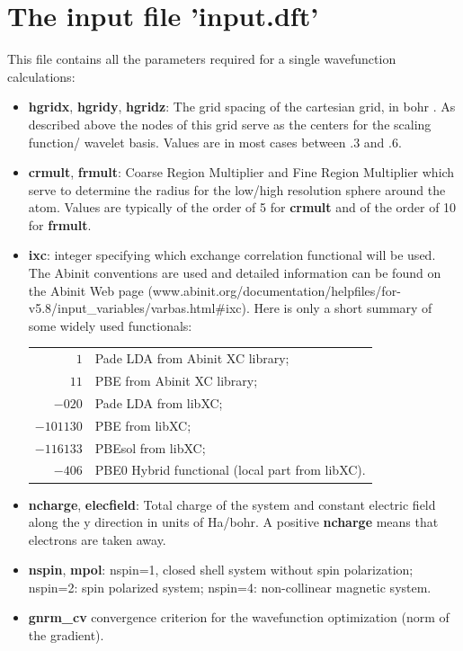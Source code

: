\documentclass[a4paper,11pt]{report}
\begin{document}
\section{The input file 'input.dft'}
This file contains all the parameters required for a single wavefunction calculations:
\begin{itemize}
\item {\bf hgridx}, {\bf hgridy}, {\bf hgridz}: The grid spacing of the cartesian grid, in bohr . As 
       described above the nodes of this grid serve as the centers for the scaling function/ wavelet basis. 
       Values are in most cases between $.3$ and $.6$.

\item {\bf crmult}, {\bf frmult}: Coarse Region Multiplier and Fine Region Multiplier which serve to determine the radius
      for the low/high resolution sphere around the atom. 
      Values are typically of the order of 5 for {\bf crmult} and of the order of 10 for  {\bf frmult}.
\item {\bf ixc}: integer specifying which exchange correlation functional will be used. The Abinit conventions are 
      used and detailed information can be found on the Abinit Web page 
      (www.abinit.org/documentation/helpfiles/for-v5.8/in\-put\_variables/varbas.html\#ixc). 
      Here is only a short summary of some wide\-ly used functionals:\\
      \begin{tabular}{rl}
      {$1$}       & Pade LDA from Abinit XC library;\\
      {$11$}      & PBE from Abinit XC library;\\
      {$-020$}    & Pade LDA from libXC;\\
      {$-101130$} & PBE from  libXC;\\
      {$-116133$} & PBEsol from libXC; \\ 
      {$-406$}    & PBE0 Hybrid functional (local part from libXC).
      \end{tabular}
\item {\bf ncharge}, {\bf elecfield}: Total charge of the system and constant electric field along the y direction in units of Ha/bohr. 
      A positive {\bf ncharge} means that electrons are taken away.
\item {\bf nspin}, {\bf mpol}: 
      nspin=1, closed shell system without spin polarization;\hfill\\
      nspin=2: spin polarized system; 
      nspin=4: non-collinear magnetic system.
\item {\bf gnrm\_cv} convergence criterion for the wavefunction optimization (norm of the gradient).

\end{itemize}
\end{document}
